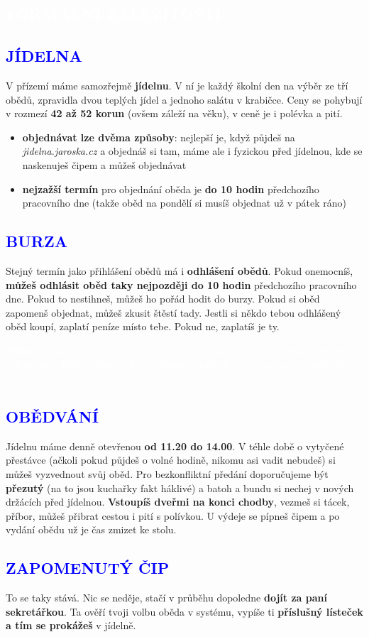 \documentclass{article}
\newcommand{\nadpisf}[1]{
\vspace*{-60pt}
  \begin{nadpisboxf}
    \vspace*{20pt}
    \centering \section*{\textcolor{white}{#1}}
  \end{nadpisboxf}
}
\newcommand{\podnadpisf}[1]{
  \subsection*{\textcolor{blue}{#1}}
}
\begin{document}
\newpage

\nadpisf{FORMÁLNÍ ZÁLEŽITOSTI}
\noindent \podnadpisf{JÍDELNA}
V přízemí máme samozřejmě \textbf{jídelnu}. V ní je každý školní den na výběr ze tří obědů, zpravidla dvou teplých jídel a jednoho salátu v krabičce. Ceny se pohybují v rozmezí \textbf{42 až 52 korun} (ovšem záleží na věku), v ceně je i polévka a pití.

\begin{itemize}[leftmargin=10pt]
  \item \textbf{objednávat lze dvěma způsoby}: nejlepší je, když půjdeš na \textit{jidelna.jaroska.cz} a objednáš si tam, máme ale i fyzickou  před jídelnou, kde se naskenuješ čipem a můžeš objednávat
  \item \textbf{nejzažší termín} pro objednání oběda je \textbf{do 10 hodin} předchozího pracovního dne (takže oběd na pondělí si musíš objednat už v pátek ráno)
\end{itemize}

\podnadpisf{BURZA}
Stejný termín jako přihlášení obědů má i \textbf{odhlášení obědů}. Pokud onemocníš, \textbf{můžeš odhlásit oběd taky nejpozději do 10 hodin} předchozího pracovního dne. Pokud to nestihneš, můžeš ho pořád hodit do burzy. Pokud si oběd zapomenš objednat, můžeš zkusit štěstí tady. Jestli si někdo tebou odhlášený oběd koupí, zaplatí peníze místo tebe. Pokud ne, zaplatíš je ty.

\begin{bluebox}
  \textcolor{white}{
    \textbf{Pozor!} Na naší škole platí následující úsporné opatření. Stát normálně dotuje velkou  část obědů. Pokud si ho ale koupíš a následně nevyzvedneš, zaplatíš plnou cenu!
  }
\end{bluebox}

\podnadpisf{OBĚDVÁNÍ}
Jídelnu máme denně otevřenou \textbf{od 11.20 do 14.00}. V téhle době o vytyčené přestávce (ačkoli pokud půjdeš o volné hodině, nikomu asi vadit nebudeš) si můžeš vyzvednout svůj oběd. Pro bezkonfliktní předání doporučujeme být \textbf{přezutý} (na to jsou kuchařky fakt háklivé) a batoh a bundu si nechej v nových držácích před jídelnou. \textbf{Vstoupíš dveřmi na konci chodby}, vezmeš si tácek, příbor, můžeš přibrat cestou i pití s polívkou. U výdeje se pípneš čipem a po vydání obědu už je čas zmizet ke stolu.

\podnadpisf{ZAPOMENUTÝ ČIP}
To se taky stává. Nic se neděje, stačí v průběhu dopoledne \textbf{dojít za paní
sekretářkou}. Ta ověří tvoji volbu oběda v systému, vypíše ti \textbf{příslušný lísteček
a tím se prokážeš} v jídelně.
\end{document}
